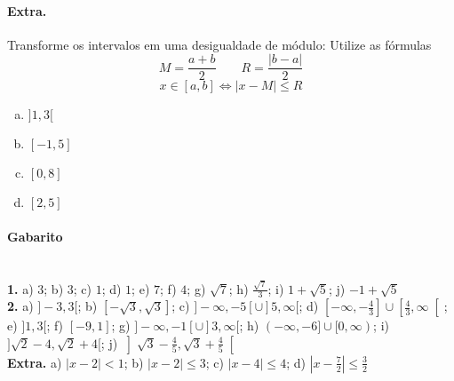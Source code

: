 \documentclass[a4paper,twocolumn,12pt]{article}
\begin{document}
\paragraph*{Extra.} Transforme os intervalos em uma desigualdade de módulo:
Utilize as fórmulas
$$M = \frac{a+b}{2} \qquad R = \frac{|b-a|}{2}$$
$$x\in[a, b] \Leftrightarrow |x-M| \le R$$
\begin{enumerate}[a)]
\item $]1, 3[$
\item $[-1, 5]$
\item $[0, 8]$
\item $[2,5]$ 
\end{enumerate}
 

  \vfill
  {\footnotesize\color{darkgray}
    \paragraph*{Gabarito} \hspace*{\fill}\\
    \textbf{1.} a) $3$; b) $3$; c) $1$; d) $1$; e) $7$; f) $4$; g) $\sqrt{7}$; h) $\frac{\sqrt{7}}{3}$; i) $1+\sqrt{5}$; j) $-1+\sqrt{5}$\\
    \textbf{2.} a) $]-3,3[$; b) $\left[-\sqrt{3},\sqrt{3}\right]$; c) $]-\infty,-5[\cup]5,\infty[$; d) $\left[-\infty,-\frac{4}{3}\right]\cup\left[\frac{4}{3},\infty\right[$; e) $]1,3[$; f) $[-9,1]$; g) $]-\infty,-1[\cup]3,\infty[$; h) $(-\infty,-6]\cup [0,\infty)$; i) $]\sqrt{2}-4,\sqrt{2}+4[$; j) $\left]\sqrt{3} - \frac{4}{5}, \sqrt{3} + \frac{4}{5} \right[$\\
    \textbf{Extra.} a) $|x-2|<1$; b) $|x-2| \le 3$; c) $|x-4| \le 4$; d) $\left|x-\frac{7}{2}\right| \le \frac{3}{2}$
  }
\end{document}
